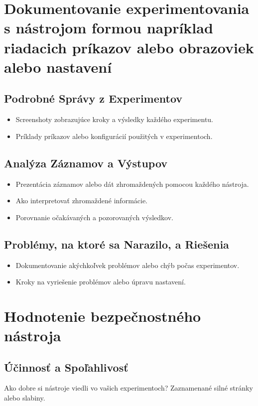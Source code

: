 \documentclass[conference]{IEEEtran}
\begin{document}
\section{Dokumentovanie experimentovania s nástrojom formou napríklad riadacich príkazov alebo obrazoviek alebo nastavení}
\subsection{Podrobné Správy z Experimentov}
\begin{itemize}
    \item Screenshoty zobrazujúce kroky a výsledky každého experimentu.
    \item Príklady príkazov alebo konfigurácií použitých v experimentoch.
\end{itemize}

\subsection{Analýza Záznamov a Výstupov}
\begin{itemize}
    \item Prezentácia záznamov alebo dát zhromaždených pomocou každého nástroja.
    \item Ako interpretovať zhromaždené informácie.
    \item Porovnanie očakávaných a pozorovaných výsledkov.
\end{itemize}

\subsection{Problémy, na ktoré sa Narazilo, a Riešenia}
\begin{itemize}
    \item Dokumentovanie akýchkoľvek problémov alebo chýb počas experimentov.
    \item Kroky na vyriešenie problémov alebo úpravu nastavení.
\end{itemize}

\section{Hodnotenie bezpečnostného nástroja}
\subsection{Účinnosť a Spoľahlivosť}
Ako dobre si nástroje viedli vo vašich experimentoch? Zaznamenané silné stránky alebo slabiny.
\end{document}
